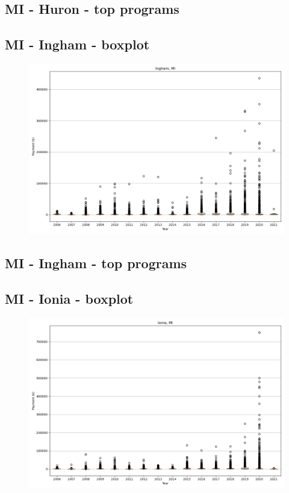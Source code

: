 \subsection*{MI - Huron - top programs}

\newpage
\subsection*{MI - Ingham - boxplot}
\begin{figure}[h]
\centering
\includegraphics[width=7in]{../output/boxplots/counties/Ingham-MI_boxplot.png}
\end{figure}


\subsection*{MI - Ingham - top programs}

\newpage
\subsection*{MI - Ionia - boxplot}
\begin{figure}[h]
\centering
\includegraphics[width=7in]{../output/boxplots/counties/Ionia-MI_boxplot.png}
\end{figure}


